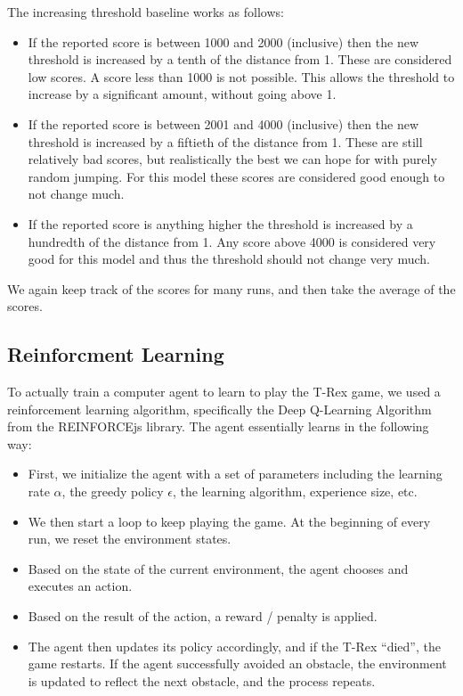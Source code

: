 \documentclass{scrartcl}
\begin{document}
    \par The increasing threshold baseline works as follows:

    \begin{itemize}
      \item If the reported score is between 1000 and 2000 (inclusive) then the new
        threshold is increased by a tenth of the distance from 1. These are
        considered low scores. A score less than 1000 is not possible. This allows
        the threshold to increase by a significant amount, without going above 1.
      \item If the reported score is between 2001 and 4000 (inclusive) then the new
        threshold is increased by a fiftieth of the distance from 1. These are still
        relatively bad scores, but realistically the best we can hope for with
        purely random jumping. For this model these scores are considered good
        enough to not change much.
      \item If the reported score is anything higher the threshold is increased by a
        hundredth of the distance from 1. Any score above 4000 is considered very
        good for this model and thus the threshold should not change very much.
    \end{itemize}

    We again keep track of the scores for many runs, and then take the average of the scores.

    \subsection{Reinforcment Learning}
    To actually train a computer agent to learn to play the T-Rex game, we used a reinforcement learning algorithm, specifically the Deep Q-Learning Algorithm from the REINFORCEjs library. The agent essentially learns in the following way:

    \begin{itemize}
        \item First, we initialize the agent with a set of parameters including the learning rate $\alpha$, the greedy policy $\epsilon$, the learning algorithm, experience size, etc.
        \item We then start a loop to keep playing the game. At the beginning of every run, we reset the environment states.
        \item Based on the state of the current environment, the agent chooses and executes an action.
        \item Based on the result of the action, a reward / penalty is applied.
        \item The agent then updates its policy accordingly, and if the T-Rex ``died'', the game restarts. If the agent successfully avoided an obstacle, the environment is updated to reflect the next obstacle, and the process repeats.
    \end{itemize}
\end{document}
